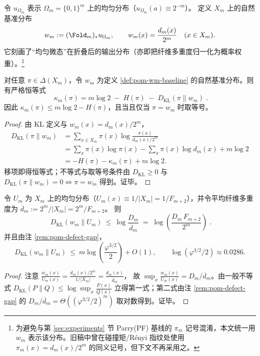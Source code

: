 \begin{definition}\label{def:pom-wm-baseline}
令 $u_{\Omega_m}$ 表示 $\Omega_m=\{0,1\}^m$ 上的均匀分布（$u_{\Omega_m}(a)\equiv 2^{-m}$）。
定义 $X_m$ 上的自然基准分布
\[
w_m:=(\Fold_m)_*u_{\Omega_m},\qquad
w_m(x)=\frac{d_m(x)}{2^m}\quad(x\in X_m).
\]
它刻画了“均匀微态”在折叠后的输出分布（亦即把纤维多重度归一化为概率权重）。\footnote{为避免与第 \ref{sec:experiments} 节 Parry(PF) 基线的 $\pi_m$ 记号混淆，本文统一用 $w_m$ 表示该分布。旧稿中曾在碰撞矩/R\'enyi 指纹处使用 $\pi_m(x)=d_m(x)/2^m$ 的同义记号，但下文不再采用之。}
\end{definition}

\begin{proposition}\label{prop:pom-kappa-kl-decomposition}
对任意 $\pi\in\Delta(X_m)$，令 $w_m$ 为定义 \ref{def:pom-wm-baseline} 的自然基准分布。则有严格恒等式
\[
\boxed{\;
\kappa_m(\pi)=m\log 2\;-\;H(\pi)\;-\;D_{\mathrm{KL}}(\pi\|w_m)\; }.
\]
因此 $\kappa_m(\pi)\le m\log 2-H(\pi)$，且当且仅当 $\pi=w_m$ 时取等号。
\end{proposition}
\begin{proof}
由 KL 定义与 $w_m(x)=d_m(x)/2^m$，
\[
\begin{aligned}
D_{\mathrm{KL}}(\pi\|w_m)
&=\sum_{x\in X_m}\pi(x)\log\frac{\pi(x)}{d_m(x)/2^m}\\
&=\sum_x\pi(x)\log\pi(x)-\sum_x\pi(x)\log d_m(x)+m\log 2\\
&=-H(\pi)-\kappa_m(\pi)+m\log 2.
\end{aligned}
\]
移项即得恒等式；不等式与取等号条件由 $D_{\mathrm{KL}}\ge 0$ 与 $D_{\mathrm{KL}}(\pi\|w_m)=0\Leftrightarrow \pi=w_m$ 得到。证毕。
\end{proof}

\begin{proposition}\label{prop:pom-wm-kl-to-uniform}
令 $U_m$ 为 $X_m$ 上的均匀分布（$U_m(x)\equiv 1/|X_m|=1/F_{m+2}$），并令平均纤维多重度为
\(
\overline d_m:=2^m/|X_m|=2^m/F_{m+2}
\)。
则
\[
\boxed{\;
D_{\mathrm{KL}}(w_m\|U_m)\ \le\ \log\frac{D_m}{\overline d_m}
\;=\;\log\!\left(\frac{D_m\,F_{m+2}}{2^m}\right)\; }.
\]
并且由注 \ref{rem:pom-defect-gap}，
\[
D_{\mathrm{KL}}(w_m\|U_m)\ \le\ m\log\!\left(\frac{\varphi^{3/2}}{2}\right)+O(1),
\qquad \log(\varphi^{3/2}/2)\approx 0.0286.
\]
\end{proposition}
\begin{proof}
注意
\(
\frac{w_m(x)}{U_m(x)}=\frac{d_m(x)/2^m}{1/|X_m|}=\frac{d_m(x)}{\overline d_m}
\)，
故 $\sup_x \frac{w_m(x)}{U_m(x)}=D_m/\overline d_m$。由一般不等式
\(
D_{\mathrm{KL}}(P\|Q)\le \log \sup_x \frac{P(x)}{Q(x)}
\)
立得第一式；第二式由注 \ref{rem:pom-defect-gap} 的 $D_m/\overline d_m=\Theta((\varphi^{3/2}/2)^m)$ 取对数得到。证毕。
\end{proof}

